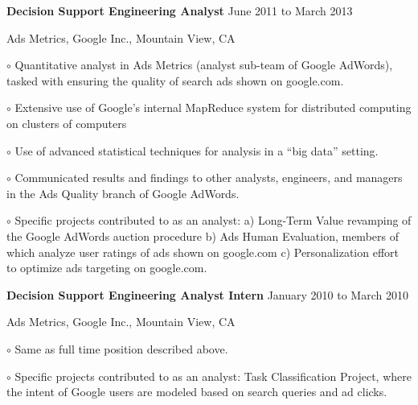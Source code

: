 \documentclass[10pt]{article}
\newcommand{\halfblankline}{\quad\vspace{-0.5\baselineskip}\pagebreak[3]}
\begin{document}
\textbf{Decision Support Engineering Analyst} \hfill {June 2011 to March 2013}
\begin{outerlist}
 	\item[] Ads Metrics, Google Inc., Mountain View, CA
    \begin{innerlist}
			\item[$\circ$] Quantitative analyst in Ads Metrics (analyst sub-team
			of Google AdWords), tasked with ensuring the quality of search
			ads shown on google.com.
			\item[$\circ$] Extensive use of Google's internal MapReduce system
			for distributed computing on clusters of computers
			\item[$\circ$] Use of advanced statistical techniques for analysis
			in a ``big data'' setting.
			\item[$\circ$] Communicated results and findings to other analysts,
			engineers, and managers in the Ads Quality branch of Google AdWords.
			\item[$\circ$] Specific projects contributed to as an analyst:
			a) Long-Term Value revamping of the Google AdWords auction
			procedure b) Ads Human Evaluation, members of which analyze user
			ratings of ads shown on google.com c) Personalization effort to
			optimize ads targeting on google.com.
    \end{innerlist}
\end{outerlist}

\halfblankline

\textbf{Decision Support Engineering Analyst Intern} \hfill {January 2010 to March 2010}
\begin{outerlist}
 	\item[] Ads Metrics, Google Inc., Mountain View, CA
    \begin{innerlist}
			\item[$\circ$] Same as full time position described above.
			\item[$\circ$] Specific projects contributed to as an analyst: Task
			Classification Project, where the intent of Google users are modeled
			based on search queries and ad clicks.
    \end{innerlist}
\end{outerlist}
\end{document}
